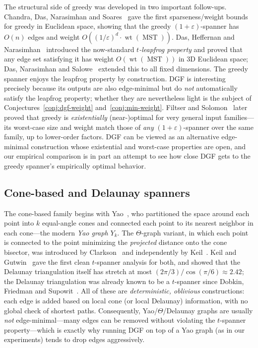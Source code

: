 \documentclass{article}
\DeclareMathOperator{\wt}{wt}
\DeclareMathOperator{\MST}{MST}
\begin{document}
The structural side of greedy was developed in two important
follow-ups. Chandra, Das, Narasimhan and Soares~\cite{CDNS95} gave the
first sparseness/weight bounds for greedy in Euclidean space, showing
that the greedy $(1+\varepsilon)$-spanner has $O(n)$ edges and weight
$O((1/\varepsilon)^d\cdot \wt(\MST))$. Das, Heffernan
and Narasimhan~\cite{DHN93} introduced the now-standard
\emph{$t$-leapfrog property} and proved that any edge set satisfying it
has weight $O(\wt(\MST))$ in 3D Euclidean space; Das,
Narasimhan and Salowe~\cite{DNS95} extended this to all fixed
dimensions. The greedy spanner enjoys the leapfrog property by
construction. DGF is interesting precisely because its outputs are also
edge-minimal but do \emph{not} automatically satisfy the leapfrog
property; whether they are nevertheless light is the subject of
Conjectures~\ref{conj:dgf-weight} and~\ref{conj:min-weight}. Filtser
and Solomon~\cite{FS20} later proved that greedy is
\emph{existentially} (near-)optimal for very general input
families---its worst-case size and weight match those of \emph{any}
$(1+\varepsilon)$-spanner over the same family, up to lower-order
factors. DGF can be viewed as an alternative edge-minimal construction
whose existential and worst-case properties are open, and our empirical
comparison is in part an attempt to see how close DGF gets to the
greedy spanner's empirically optimal behavior.

\subsection{Cone-based and Delaunay spanners}
\label{subsec:rw-cone}

The cone-based family begins with Yao~\cite{Yao82}, who partitioned the
space around each point into $k$ equal-angle cones and connected each
point to its nearest neighbor in each cone---the modern \emph{Yao graph
$Y_k$}. The $\Theta$-graph variant, in which each point is connected to
the point minimizing the \emph{projected} distance onto the cone
bisector, was introduced by Clarkson~\cite{Clarkson87} and
independently by Keil~\cite{Keil88}. Keil and Gutwin~\cite{KG92} gave
the first clean $t$-spanner analysis for both, and showed that the
Delaunay triangulation itself has stretch at most
$(2\pi/3)/\cos(\pi/6)\approx 2.42$; the Delaunay triangulation was
already known to be a $t$-spanner since Dobkin, Friedman and
Supowit~\cite{DFS90}. All of these are \emph{deterministic, oblivious}
constructions: each edge is added based on local cone (or local
Delaunay) information, with no global check of shortest paths.
Consequently, Yao/$\Theta$/Delaunay graphs are usually \emph{not}
edge-minimal---many edges can be removed without violating the
$t$-spanner property---which is exactly why running DGF on top of a Yao
graph (as in our experiments) tends to drop edges aggressively.
\end{document}
